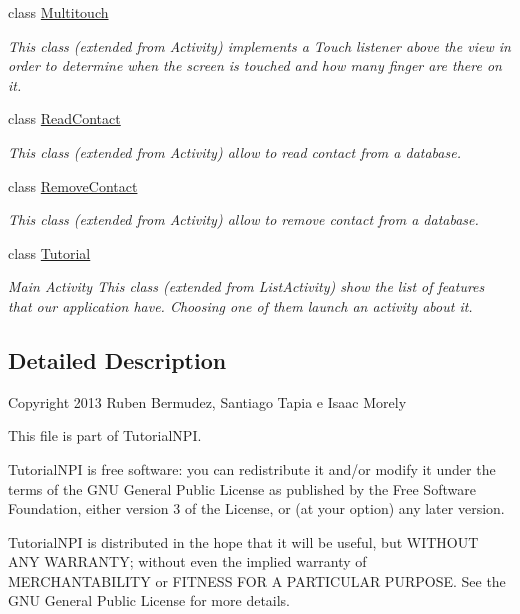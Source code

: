\begin{DoxyCompactItemize}
class \hyperlink{classnpi_1_1practicaandroid_1_1tutorialnpi_1_1_multitouch}{Multitouch}
\begin{DoxyCompactList}\small\item\em This class (extended from Activity) implements a Touch listener above the view in order to determine when the screen is touched and how many finger are there on it. \end{DoxyCompactList}\item 
class \hyperlink{classnpi_1_1practicaandroid_1_1tutorialnpi_1_1_read_contact}{Read\-Contact}
\begin{DoxyCompactList}\small\item\em This class (extended from Activity) allow to read contact from a database. \end{DoxyCompactList}\item 
class \hyperlink{classnpi_1_1practicaandroid_1_1tutorialnpi_1_1_remove_contact}{Remove\-Contact}
\begin{DoxyCompactList}\small\item\em This class (extended from Activity) allow to remove contact from a database. \end{DoxyCompactList}\item 
class \hyperlink{classnpi_1_1practicaandroid_1_1tutorialnpi_1_1_tutorial}{Tutorial}
\begin{DoxyCompactList}\small\item\em Main Activity This class (extended from List\-Activity) show the list of features that our application have. Choosing one of them launch an activity about it. \end{DoxyCompactList}\end{DoxyCompactItemize}


\subsection{Detailed Description}
Copyright 2013 Ruben Bermudez, Santiago Tapia e Isaac Morely

This file is part of Tutorial\-N\-P\-I.

Tutorial\-N\-P\-I is free software\-: you can redistribute it and/or modify it under the terms of the G\-N\-U General Public License as published by the Free Software Foundation, either version 3 of the License, or (at your option) any later version.

Tutorial\-N\-P\-I is distributed in the hope that it will be useful, but W\-I\-T\-H\-O\-U\-T A\-N\-Y W\-A\-R\-R\-A\-N\-T\-Y; without even the implied warranty of M\-E\-R\-C\-H\-A\-N\-T\-A\-B\-I\-L\-I\-T\-Y or F\-I\-T\-N\-E\-S\-S F\-O\-R A P\-A\-R\-T\-I\-C\-U\-L\-A\-R P\-U\-R\-P\-O\-S\-E. See the G\-N\-U General Public License for more details.

